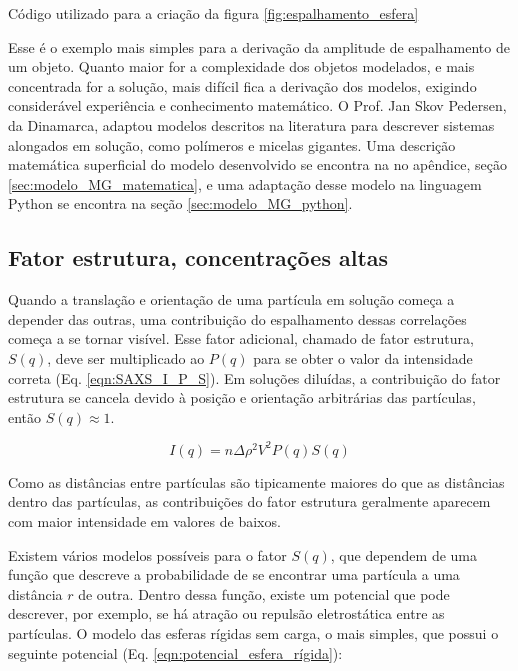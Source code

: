 		\begin{listing}[h]
			\inputminted{python}{./python/plot_saxs_esfera.py}
			\caption{Código utilizado para a criação da figura \ref{fig:espalhamento_esfera}}
			\label{lst:plot_micela_esferica}
		\end{listing}
		
		Esse é o exemplo mais simples para a derivação da amplitude de espalhamento de um objeto. Quanto maior for a complexidade dos objetos modelados, e mais concentrada for a solução, mais difícil fica a derivação dos modelos, exigindo considerável experiência e conhecimento matemático. O Prof. Jan Skov Pedersen, da Dinamarca, adaptou modelos descritos na literatura para descrever sistemas alongados em solução, como polímeros e micelas gigantes. Uma descrição matemática superficial do modelo desenvolvido se encontra na no apêndice, seção \ref{sec:modelo_MG_matematica}, e uma adaptação desse modelo na linguagem Python se encontra na seção \ref{sec:modelo_MG_python}.
		
		\subsection{Fator estrutura, concentrações altas} 
		
		Quando a translação e orientação de uma partícula em solução começa a depender das outras, uma contribuição do espalhamento dessas correlações começa a se tornar visível. Esse fator adicional, chamado de fator estrutura, \(S(q)\), deve ser multiplicado ao \(P(q)\) para se obter o valor da intensidade correta (Eq. \ref{eqn:SAXS_I_P_S}). Em soluções diluídas, a contribuição do fator estrutura se cancela devido à posição e orientação arbitrárias das partículas, então \(S(q) \approx 1\).
		
		\begin{equation}
			I(q) = n\Delta \rho^2 V^2 P(q) S(q)
			\label{eqn:SAXS_I_P_S}
		\end{equation}
		
		Como as distâncias entre partículas são tipicamente maiores do que as distâncias dentro das partículas, as contribuições do fator estrutura geralmente aparecem com maior intensidade em valores de \q{} baixos.
		
		Existem vários modelos possíveis para o fator \(S(q)\), que dependem de uma função que descreve a probabilidade de se encontrar uma partícula a uma distância \(r\) de outra. Dentro dessa função, existe um potencial que pode descrever, por exemplo, se há atração ou repulsão eletrostática entre as partículas. O modelo das esferas rígidas sem carga, o mais simples, que possui o seguinte potencial (Eq. \ref{eqn:potencial_esfera_rígida}):
		
